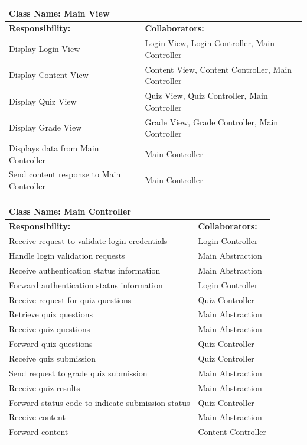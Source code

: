 \documentclass[]{article}
\begin{document}
	
	\begin{table}[H]
	\centering
		\begin{tabular}{|p{9cm}|p{3cm}|}
		\hline
		 \multicolumn{2}{|l|}{\textbf{Class Name: Main View}} \\
		\hline
		\textbf{Responsibility:} & \textbf{Collaborators:} \\
		\hline
	    Display Login View & Login View, Login Controller, Main Controller\\
		\hline
		Display Content View & Content View, Content Controller, Main Controller 	\\
		\hline
		Display Quiz View & Quiz View, Quiz Controller, Main Controller\\
		\hline
		Display Grade View & Grade View, Grade Controller, Main Controller\\
		\hline 
		Displays data from Main Controller & Main Controller\\
		\hline
		Send content response to Main Controller & Main Controller\\
		\hline
		\end{tabular}
	\end{table}	
	
	\begin{table}[H]
	\centering
		\begin{tabular}{|p{9cm}|p{3cm}|}
		\hline
		 \multicolumn{2}{|l|}{\textbf{Class Name: Main Controller}} \\
		\hline
		\textbf{Responsibility:} & \textbf{Collaborators:} \\
		\hline
	    Receive request to validate login credentials & Login Controller\\
		\hline
	    Handle login validation requests & Main Abstraction\\
		\hline
		Receive authentication status information & Main Abstraction\\
		\hline
		Forward authentication status information & Login Controller\\
		\hline
		Receive request for quiz questions & Quiz Controller\\
		\hline
		Retrieve quiz questions & Main Abstraction \\
		\hline
		Receive quiz questions & Main Abstraction\\
		\hline
		Forward quiz questions & Quiz Controller\\
		\hline
		Receive quiz submission & Quiz Controller\\
		\hline
		Send request to grade quiz submission & Main Abstraction\\
		\hline
		Receive quiz results & Main Abstraction\\
		\hline
		Forward status code to indicate submission status & Quiz Controller\\
		\hline
		Receive content & Main Abstraction\\
		\hline
		Forward content & Content Controller\\
		\hline
		\end{tabular}
	\end{table}
	
\end{document}

